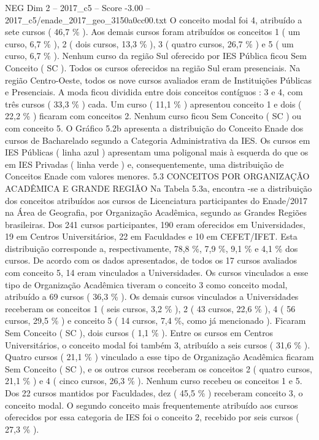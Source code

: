 \begin{textsample}{NEG Dim 2 – 2017\_c5 – Score -3.00 – 2017\_c5/enade\_2017\_geo\_3150a0cc00.txt}
O conceito modal foi 4, atribuído a sete cursos ( 46,7 \% ).
Aos demais cursos foram atribuídos os conceitos 1 ( um curso, 6,7 \% ), 2 ( dois cursos, 13,3 \% ), 3 ( quatro cursos, 26,7 \% ) e 5 ( um curso, 6,7 \% ).
Nenhum curso da região Sul oferecido por IES Pública ficou Sem Conceito ( SC ).
Todos os cursos oferecidos na região Sul eram presenciais.
Na região Centro-Oeste, todos os nove cursos avaliados eram de Instituições Públicas e Presenciais.
A moda ficou dividida entre dois conceitos contíguos : 3 e 4, com três cursos ( 33,3 \% ) cada.
Um curso ( 11,1 \% ) apresentou conceito 1 e dois ( 22,2 \% ) ficaram com conceitos 2.
Nenhum curso ficou Sem Conceito ( SC ) ou com conceito 5.
O Gráfico 5.2b apresenta a distribuição do Conceito Enade dos cursos de Bacharelado segundo a Categoria Administrativa da IES.
Os cursos em IES Públicas ( linha azul ) apresentam uma poligonal mais à esquerda do que os em IES Privadas ( linha verde ) e, consequentemente, uma distribuição de Conceitos Enade com valores menores. 5.3 CONCEITOS POR ORGANIZAÇÃO ACADÊMICA E GRANDE REGIÃO Na Tabela 5.3a, encontra -se a distribuição dos conceitos atribuídos aos cursos de Licenciatura participantes do Enade/2017 na Área de Geografia, por Organização Acadêmica, segundo as Grandes Regiões brasileiras.
Dos 241 cursos participantes, 190 eram oferecidos em Universidades, 19 em Centros Universitários, 22 em Faculdades e 10 em CEFET/IFET.
Esta distribuição corresponde a, respectivamente, 78,8 \%, 7,9 \%, 9,1 \% e 4,1 \% dos cursos.
De acordo com os dados apresentados, de todos os 17 cursos avaliados com conceito 5, 14 eram vinculados a Universidades.
Os cursos vinculados a esse tipo de Organização Acadêmica tiveram o conceito 3 como conceito modal, atribuído a 69 cursos ( 36,3 \% ).
Os demais cursos vinculados a Universidades receberam os conceitos 1 ( seis cursos, 3,2 \% ), 2 ( 43 cursos, 22,6 \% ), 4 ( 56 cursos, 29,5 \% ) e conceito 5 ( 14 cursos, 7,4 \%, como já mencionado ).
Ficaram Sem Conceito ( SC ), dois cursos ( 1,1 \% ).
Entre os cursos em Centros Universitários, o conceito modal foi também 3, atribuído a seis cursos ( 31,6 \% ).
Quatro cursos ( 21,1 \% ) vinculado a esse tipo de Organização Acadêmica ficaram Sem Conceito ( SC ), e os outros cursos receberam os conceitos 2 ( quatro cursos, 21,1 \% ) e 4 ( cinco cursos, 26,3 \% ).
Nenhum curso recebeu os conceitos 1 e 5.
Dos 22 cursos mantidos por Faculdades, dez ( 45,5 \% ) receberam conceito 3, o conceito modal.
O segundo conceito mais frequentemente atribuído aos cursos oferecidos por essa categoria de IES foi o conceito 2, recebido por seis cursos ( 27,3 \% ).

\end{textsample}
